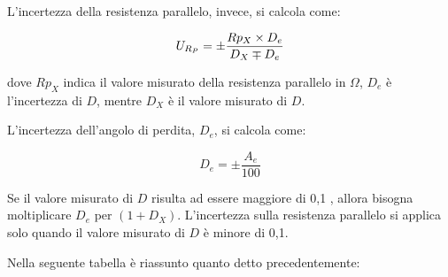 \begin{table}[H]
\centering
{}
\caption{Tabella di incertezza fornita dal costruttore, con Uz l'incertezza}
\label{tab:lcr_c_sheet}
\end{table}
\FloatBarrier

L’incertezza della resistenza parallelo, invece, si calcola come:

\begin{equation}
        U_{R_P} = \pm \frac{Rp_X \times D_e}{D_X \mp D_e}  \\
\end{equation}

dove $Rp_X$ indica il valore misurato della resistenza parallelo in $\Omega$, $D_e$ è l’incertezza di 
$D$, mentre $D_X$ è il valore misurato di $D$.

L’incertezza dell’angolo di perdita, $D_e$, si calcola come:

\begin{equation}
    D_e = \pm \frac{A_e}{100}
\end{equation}

Se il valore misurato di $D$ risulta ad essere maggiore di 0,1 , allora bisogna 
moltiplicare $D_e$ per $(1+D_X)$. L’incertezza sulla resistenza parallelo si applica solo 
quando il valore misurato di $D$ è minore di 0,1.

Nella seguente tabella è riassunto quanto detto precedentemente:

